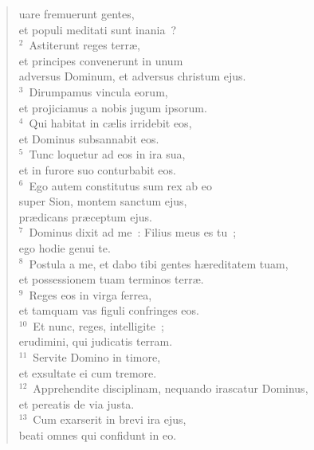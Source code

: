 \bchapter[Psalm]
\begin{verse}uare fremuerunt gentes,\\ et populi meditati sunt inania~?\\
${}^{2}$~Astiterunt reges terr\ae ,\\ et principes convenerunt in unum\\ adversus Dominum, et adversus christum ejus.\\
${}^{3}$~Dirumpamus vincula eorum,\\ et projiciamus a nobis jugum ipsorum.\\
${}^{4}$~Qui habitat in c\ae lis irridebit eos,\\ et Dominus subsannabit eos.\\
${}^{5}$~Tunc loquetur ad eos in ira sua,\\ et in furore suo conturbabit eos.\\
${}^{6}$~Ego autem constitutus sum rex ab eo\\ super Sion, montem sanctum ejus,\\ pr\ae dicans pr\ae ceptum ejus.\\
${}^{7}$~Dominus dixit ad me~: Filius meus es tu~;\\ ego hodie genui te.\\
${}^{8}$~Postula a me, et dabo tibi gentes h\ae reditatem tuam,\\ et possessionem tuam terminos terr\ae .\\
${}^{9}$~Reges eos in virga ferrea,\\ et tamquam vas figuli confringes eos.\\
${}^{10}$~Et nunc, reges, intelligite~;\\ erudimini, qui judicatis terram.\\
${}^{11}$~Servite Domino in timore,\\ et exsultate ei cum tremore.\\
${}^{12}$~Apprehendite disciplinam, nequando irascatur Dominus,\\ et pereatis de via justa.\\
${}^{13}$~Cum exarserit in brevi ira ejus,\\ beati omnes qui confidunt in eo.\end{verse}



